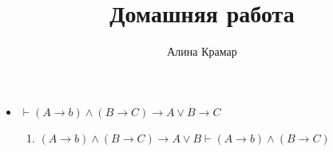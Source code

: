 \documentclass{article}
\begin{document}
\title{Домашняя работа}
\author{Алина Крамар}

\maketitle
\begin{itemize}

\item $\vdash (A \to b) \land (B \to C) \to A \lor B \to C$

\begin{enumerate}

\item $(A \to b) \land (B \to C) \to A \lor B \vdash (A \to b) \land (B \to C) $
\end{enumerate}


\end{itemize}
\end{document}
